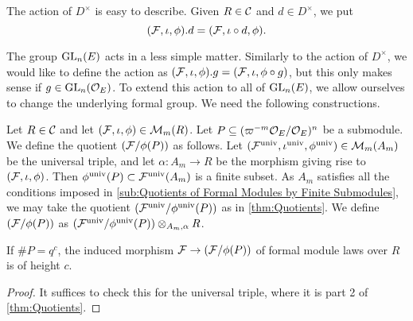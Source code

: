 \documentclass[../main.tex]{subfiles}
\begin{document}
The action of $D^\times$ is easy to describe. Given $R \in \mathcal{C}$ and 
$d \in D^\times$, we put
\begin{equation*}
  (\mathcal{F}, \iota, \phi).d = (\mathcal{F}, \iota \circ d, \phi).
\end{equation*}

The group $\operatorname{GL}_n(E)$ acts in a less simple matter. Similarly to the action of
$D^\times$, we would like to define the action as
$(\mathcal{F}, \iota, \phi).g = (\mathcal{F}, \iota, \phi \circ g)$, but this only makes sense
if $g \in \operatorname{GL}_n(\mathcal{O}_E)$. To extend this action to all of $\operatorname{GL}_n(E)$, we
allow ourselves to change the underlying formal group.
We need the following constructions.

\begin{defi}\label{def:QuotientModule}
  Let $R \in \mathcal{C}$ and let $(\mathcal{F}, \iota, \phi) \in \mathcal{M}_m(R)$. Let $P \subseteq (\varpi^{-m}\mathcal{O}_E/\mathcal{O}_E)^n$ be a submodule.
  We define the quotient $(\mathcal{F}/\phi(P))$ as follows. Let 
  $(\mathcal{F}^{\mathrm{univ}}, \iota^{\mathrm{univ}}, \phi^{{\mathrm{univ}}}) \in \mathcal{M}_m(A_m)$ be the universal triple, and let $\alpha\colon A_m \to R$ be the morphism giving rise to
  $(\mathcal{F}, \iota, \phi)$. Then $\phi^{\mathrm{univ}}(P) \subset \mathcal{F}^{\mathrm{univ}}(A_m)$ is a 
  finite subset. As $A_m$ satisfies all the conditions imposed in
  \cref{sub:Quotients of Formal Modules by Finite Submodules}, we may take the quotient
  $(\mathcal{F}^{\mathrm{univ}}/\phi^{\mathrm{univ}}(P))$ as in \cref{thm:Quotients}. We define
  $(\mathcal{F}/\phi(P))$ as $(\mathcal{F}^{\mathrm{univ}}/\phi^{\mathrm{univ}}(P))\otimes_{A_m,\alpha} R$. 
\end{defi}

\begin{lem}\label{lem:PropertyOfQuotient}
  If $\# P = q^c$, the induced morphism $\mathcal{F} \to (\mathcal{F}/\phi(P))$ of formal
  module laws over $R$ is of height $c$.
\begin{proof}
  It suffices to check this for the universal triple, where it is part 2 of 
  \cref{thm:Quotients}.
\end{proof}
\end{lem}
\end{document}
